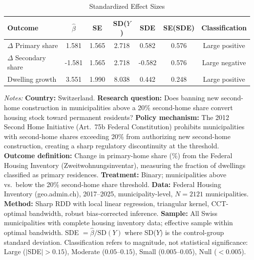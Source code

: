 \begin{table}[htbp]
\centering
\caption{Standardized Effect Sizes}
\label{tab:sde}
\begin{tabular}{lcccccc}
\toprule
Outcome & $\hat{\beta}$ & SE & SD($Y$) & SDE & SE(SDE) & Classification \\
\midrule
$\Delta$ Primary share & 1.581 & 1.565 & 2.718 & 0.582 & 0.576 & Large positive \\
$\Delta$ Secondary share & -1.581 & 1.565 & 2.718 & -0.582 & 0.576 & Large negative \\
Dwelling growth & 3.551 & 1.990 & 8.038 & 0.442 & 0.248 & Large positive \\
\bottomrule
\end{tabular}
\begin{tablenotes}[flushleft]\footnotesize
\item \textit{Notes:} \textbf{Country:} Switzerland. \textbf{Research question:} Does banning new second-home construction in municipalities above a 20\% second-home share convert housing stock toward permanent residents? \textbf{Policy mechanism:} The 2012 Second Home Initiative (Art.~75b Federal Constitution) prohibits municipalities with second-home shares exceeding 20\% from authorizing new second-home construction, creating a sharp regulatory discontinuity at the threshold. \textbf{Outcome definition:} Change in primary-home share (\%) from the Federal Housing Inventory (Zweitwohnungsinventar), measuring the fraction of dwellings classified as primary residences. \textbf{Treatment:} Binary; municipalities above vs.\ below the 20\% second-home share threshold. \textbf{Data:} Federal Housing Inventory (geo.admin.ch), 2017--2025, municipality-level, $N = 2121$ municipalities. \textbf{Method:} Sharp RDD with local linear regression, triangular kernel, CCT-optimal bandwidth, robust bias-corrected inference. \textbf{Sample:} All Swiss municipalities with complete housing inventory data; effective sample within optimal bandwidth. SDE $= \hat{\beta} / \text{SD}(Y)$ where SD($Y$) is the control-group standard deviation. Classification refers to magnitude, not statistical significance: Large ($|$SDE$| > 0.15$), Moderate ($0.05$--$0.15$), Small ($0.005$--$0.05$), Null ($< 0.005$).
\end{tablenotes}
\end{table}
